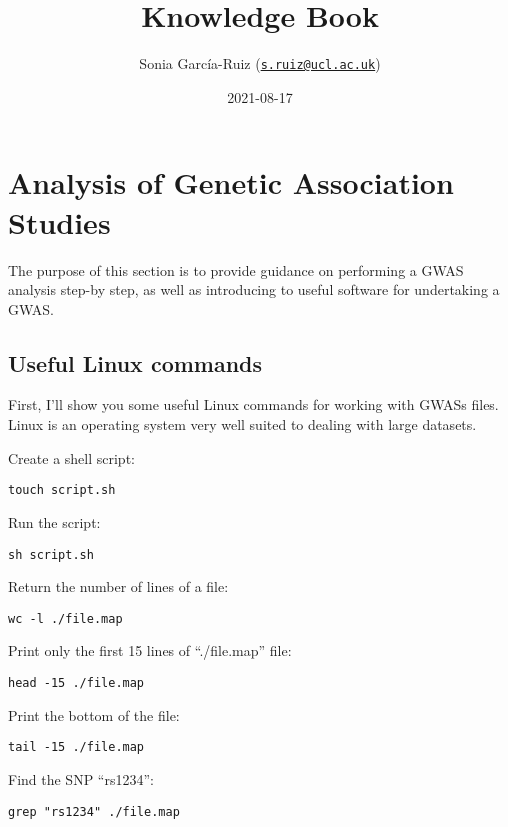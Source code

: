 \documentclass[]{book}
\title{Knowledge Book}
\author{Sonia García-Ruiz
(\href{mailto:s.ruiz@ucl.ac.uk}{\nolinkurl{s.ruiz@ucl.ac.uk}})}
\date{2021-08-17}
\begin{document}
\maketitle

{
\setcounter{tocdepth}{1}
\tableofcontents
}
\chapter{Analysis of Genetic Association
Studies}\label{analysis-of-genetic-association-studies}

The purpose of this section is to provide guidance on performing a GWAS
analysis step-by step, as well as introducing to useful software for
undertaking a GWAS.

\section{Useful Linux commands}\label{useful-linux-commands}

First, I'll show you some useful Linux commands for working with GWASs
files. Linux is an operating system very well suited to dealing with
large datasets.

Create a shell script:

\begin{verbatim}
touch script.sh
\end{verbatim}

Run the script:

\begin{verbatim}
sh script.sh
\end{verbatim}

Return the number of lines of a file:

\begin{verbatim}
wc -l ./file.map
\end{verbatim}

Print only the first 15 lines of ``./file.map'' file:

\begin{verbatim}
head -15 ./file.map
\end{verbatim}

Print the bottom of the file:

\begin{verbatim}
tail -15 ./file.map
\end{verbatim}

Find the SNP ``rs1234'':

\begin{verbatim}
grep "rs1234" ./file.map
\end{verbatim}
\end{document}
